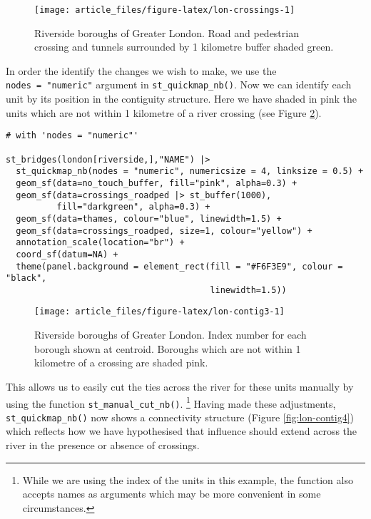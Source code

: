 \begin{figure}

{\centering \texttt{[image: article\_files/figure-latex/lon-crossings-1]} 

}

\caption{Riverside boroughs of Greater London. Road and pedestrian crossing and tunnels surrounded by 1 kilometre buffer shaded green. }\label{fig:lon-crossings}
\end{figure}

In order the identify the changes we wish to make, we use the
\texttt{nodes\ =\ "numeric"} argument in \texttt{st\_quickmap\_nb()}. Now we can identify
each unit by its position in the contiguity structure. Here we have
shaded in pink the units which are not within 1 kilometre of a river
crossing (see Figure \ref{fig:lon-contig3}).

\begin{verbatim}
# with 'nodes = "numeric"'

st_bridges(london[riverside,],"NAME") |> 
  st_quickmap_nb(nodes = "numeric", numericsize = 4, linksize = 0.5) +
  geom_sf(data=no_touch_buffer, fill="pink", alpha=0.3) + 
  geom_sf(data=crossings_roadped |> st_buffer(1000), 
          fill="darkgreen", alpha=0.3) +
  geom_sf(data=thames, colour="blue", linewidth=1.5) + 
  geom_sf(data=crossings_roadped, size=1, colour="yellow") + 
  annotation_scale(location="br") +
  coord_sf(datum=NA) + 
  theme(panel.background = element_rect(fill = "#F6F3E9", colour = "black", 
                                        linewidth=1.5))
\end{verbatim}

\begin{figure}

{\centering \texttt{[image: article\_files/figure-latex/lon-contig3-1]} 

}

\caption{Riverside boroughs of Greater London. Index number for each borough shown at centroid. Boroughs which are not within 1 kilometre of a crossing are shaded pink. }\label{fig:lon-contig3}
\end{figure}

This allows us to easily cut the ties across the river for these units
manually by using the function \texttt{st\_manual\_cut\_nb()}. \footnote{While we are using the index of the units in this example, the function also
  accepts names as arguments which may be more convenient in some circumstances.} Having made these adjustments,
\texttt{st\_quickmap\_nb()} now shows a connectivity structure (Figure \ref{fig:lon-contig4}) which reflects how we have hypothesised that influence should extend across the river in the presence or absence of crossings.

